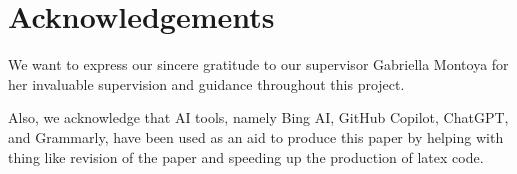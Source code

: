 \section{Acknowledgements}\label{sec:acknowledgements}
We want to express our sincere gratitude to our supervisor Gabriella Montoya for her invaluable supervision and guidance throughout this project.

Also, we acknowledge that AI tools, namely Bing AI, GitHub Copilot, ChatGPT, and Grammarly, have been used as an aid to produce this paper by helping with thing like revision of the paper and speeding up the production of latex code.